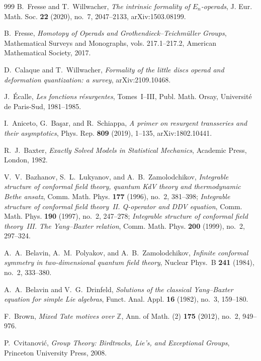 \begin{thebibliography}{999}
B.~Fresse and T.~Willwacher, \emph{The intrinsic formality of $E_n$-operads}, J. Eur. Math. Soc. \textbf{22} (2020), no.~7, 2047--2133, arXiv:1503.08199.

B.~Fresse, \emph{Homotopy of Operads and Grothendieck--Teichm\"uller Groups}, Mathematical Surveys and Monographs, vols. 217.1--217.2, American Mathematical Society, 2017.

D.~Calaque and T.~Willwacher, \emph{Formality of the little discs operad and deformation quantization: a survey}, arXiv:2109.10468.

J.~\'Ecalle, \emph{Les fonctions r\'esurgentes}, Tomes~I--III, Publ. Math. Orsay, Universit\'e de Paris-Sud, 1981--1985.

I.~Aniceto, G.~Ba\c{s}ar, and R.~Schiappa, \emph{A primer on resurgent transseries and their asymptotics}, Phys. Rep. \textbf{809} (2019), 1--135, arXiv:1802.10441.


R.~J.~Baxter, \emph{Exactly Solved Models in Statistical Mechanics}, Academic Press, London, 1982.

V.~V.~Bazhanov, S.~L.~Lukyanov, and A.~B.~Zamolodchikov, \emph{Integrable structure of conformal field theory, quantum KdV theory and thermodynamic Bethe ansatz}, Comm. Math. Phys. \textbf{177} (1996), no.~2, 381--398; \emph{Integrable structure of conformal field theory~II. Q-operator and DDV equation}, Comm. Math. Phys. \textbf{190} (1997), no.~2, 247--278; \emph{Integrable structure of conformal field theory~III. The Yang--Baxter relation}, Comm. Math. Phys. \textbf{200} (1999), no.~2, 297--324.

A.~A.~Belavin, A.~M.~Polyakov, and A.~B.~Zamolodchikov, \emph{Infinite conformal symmetry in two-dimensional quantum field theory}, Nuclear Phys.~B \textbf{241} (1984), no.~2, 333--380.

A.~A.~Belavin and V.~G.~Drinfeld, \emph{Solutions of the classical Yang--Baxter equation for simple Lie algebras}, Funct. Anal. Appl. \textbf{16} (1982), no.~3, 159--180.

F.~Brown, \emph{Mixed Tate motives over $\mathbb{Z}$}, Ann. of Math. (2) \textbf{175} (2012), no.~2, 949--976.

P.~Cvitanovi\'{c}, \emph{Group Theory: Birdtracks, Lie's, and Exceptional Groups}, Princeton University Press, 2008.


\end{thebibliography}
